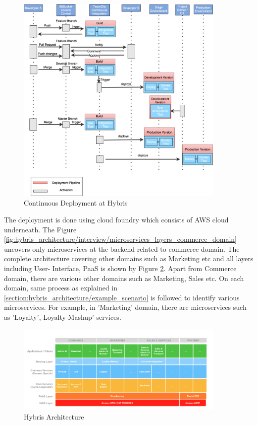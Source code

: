 \begin{figure}[H]
\begin{center}
\includegraphics[width=0.9\textwidth]{figures/hybris_architecture_continuous_deployment_flow}
\caption{Continuous Deployment at Hybris}
\label{fig:hybris_architecture/interview/continuous_deployment_flow}
\end{center}
\end{figure}

The deployment is done using cloud foundry which consists of \acrshort{AWS} cloud underneath.
The Figure \ref{fig:hybris_architecture/interview/microservices_layers_commerce_domain} uncovers only microservices at the backend related to commerce domain. The complete architecture covering other domains such as Marketing etc and all layers including User- Interface, \acrshort{PaaS} is shown by Figure \ref{fig:hybris_architecture/interview/hybris-architecture}. Apart from Commerce domain, there are various other domains such as Marketing, Sales etc. On each domain, same process as explained in \ref{section:hybris_architecture/example_scenario} is followed to identify various microservices. For example, in 'Marketing' domain, there are microservices such as 'Loyalty', Loyalty Mashup' services.
\\
\begin{figure}[H]
\begin{center}
\includegraphics[width=0.9\textwidth]{figures/hybris-architecture-five}
\caption{Hybris Architecture}
\label{fig:hybris_architecture/interview/hybris-architecture}
\end{center}
\end{figure}

